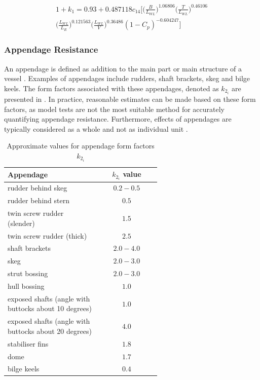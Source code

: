 \begin{multline}\label{eqn:1+k1}
    1+k_1 = 0.93 + 0.487118c_{14}\Biggl[ \Biggl(\frac{B}{L_{WL}}\Biggr)^{1.06806}  \Biggl(\frac{T}{L_{WL}}\Biggr)^{0.46106} \\ 
    \Biggl(\frac{L_{WL}}{L_R}\Biggr)^{0.121563} \Biggl(\frac{L_{WL}}{V}\Biggr)^{0.36486} (1-C_p)^{-0.604247} \Biggr] 
\end{multline}

\subsubsection*{Appendage Resistance}

An appendage is defined as addition to the main part or main structure of a vessel . Examples of appendages include rudders, shaft brackets, skeg and bilge keels. The form factors associated with these appendages, denoted as $k_{2_i}$ are presented in . In practice, reasonable estimates can be made based on these form factors, as model tests are not the most suitable method for accurately quantifying appendage resistance. Furthermore, effects of appendages are typically considered as a whole and not as individual unit .\\

\begin{table}[ht]
    \footnotesize
    \centering
    {\begin{tabular}{ p{0.6\linewidth} c}
    \hline
    Appendage & $k_{2_i}$ value \\
    \hline
    rudder behind skeg & $0.2-0.5$ \\
    rudder behind stern & $0.5$ \\
    twin screw rudder (slender) & $1.5$ \\
    twin screw rudder (thick) & $2.5$ \\
    shaft brackets & $2.0-4.0$ \\
    skeg & $2.0-3.0$ \\
    strut bossing & $2.0-3.0$ \\
    hull bossing & $1.0$ \\
    exposed shafts (angle with buttocks about 10 degrees) & $1.0$ \\
    exposed shafts (angle with buttocks about 20 degrees) & $4.0$ \\
    stabiliser fins & $1.8$ \\
    dome & $1.7$ \\
    bilge keels & $0.4$ \\ 
    \hline
    \end{tabular}}
\caption{Approximate values for appendage form factors $k_{2_i}$}\label{tbl:k2i_values}
\end{table}

